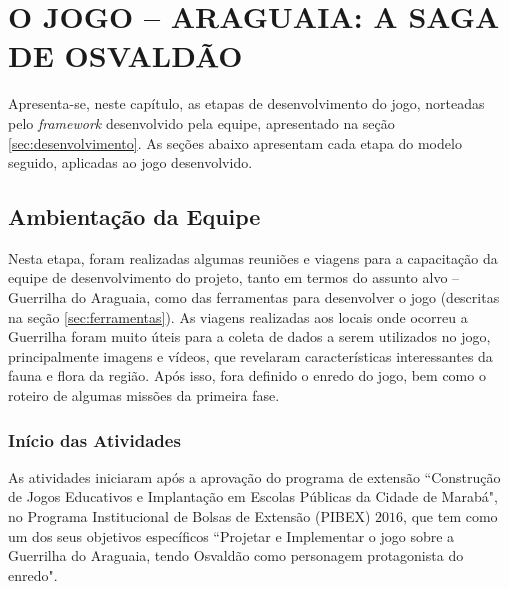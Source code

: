 
\chapter{O JOGO -- ARAGUAIA: A SAGA DE OSVALDÃO}
\label{chap:araguaia-osvaldao}

Apresenta-se, neste capítulo, as etapas de desenvolvimento do jogo, norteadas pelo \textit{framework} desenvolvido pela equipe, apresentado na seção \ref{sec:desenvolvimento}. As seções abaixo apresentam cada etapa do modelo seguido, aplicadas ao jogo desenvolvido.

\section{Ambientação da Equipe}
\label{sec:ambientacao}

Nesta etapa, foram realizadas algumas reuniões e viagens para a capacitação da equipe de desenvolvimento do projeto, tanto em termos do assunto alvo -- Guerrilha do Araguaia, como das ferramentas para desenvolver o jogo (descritas na seção \ref{sec:ferramentas}). As viagens realizadas aos locais onde ocorreu a Guerrilha foram muito úteis para a coleta de dados a serem utilizados no jogo, principalmente imagens e vídeos, que revelaram características interessantes da fauna e flora da região. Após isso, fora definido o enredo do jogo, bem como o roteiro de algumas missões da primeira fase.

\subsection{Início das Atividades}

As atividades iniciaram após a aprovação do programa de extensão ``Construção de Jogos Educativos e Implantação em Escolas Públicas da Cidade de Marabá", no Programa Institucional de Bolsas de Extensão (PIBEX) $2016$, que tem como um dos seus objetivos específicos ``Projetar e Implementar o jogo sobre a Guerrilha do Araguaia, tendo Osvaldão como personagem protagonista do enredo".

